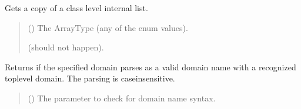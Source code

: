 \documentclass[letterpaper,10pt,english]{sphinxmanual}
\begin{document}
\begin{fulllineitems}
\begin{fulllineitems}
\label{\detokenize{apache_commons_validator_python.routines:apache_commons_validator_python.routines.domain_validator.DomainValidator.get_tld_entries}}
\pysigstartsignatures
{}
\pysigstopsignatures
\sphinxAtStartPar
Gets a copy of a class level internal list.
\begin{quote}\begin{description}
\sphinxAtStartPar
{} ({\hyperref[\detokenize{apache_commons_validator_python.routines:apache_commons_validator_python.routines.domain_validator.DomainValidator.ArrayType}]{}}) \textendash{} The ArrayType (any of the enum values).

\sphinxAtStartPar
\begin{description}
\sphinxAtStartPar
(should not happen).

\end{description}


\end{description}\end{quote}

\end{fulllineitems}


\begin{fulllineitems}
\label{\detokenize{apache_commons_validator_python.routines:apache_commons_validator_python.routines.domain_validator.DomainValidator.is_valid}}
\pysigstartsignatures
{}
\pysigstopsignatures
\sphinxAtStartPar
Returns  if the specified domain parses as a valid domain name
with a recognized top\sphinxhyphen{}level domain. The parsing is case\sphinxhyphen{}insensitive.
\begin{quote}\begin{description}
\sphinxAtStartPar
{} () \textendash{} The parameter to check for domain name syntax.


\end{description}
\end{quote}
\end{fulllineitems}
\end{fulllineitems}
\end{document}
